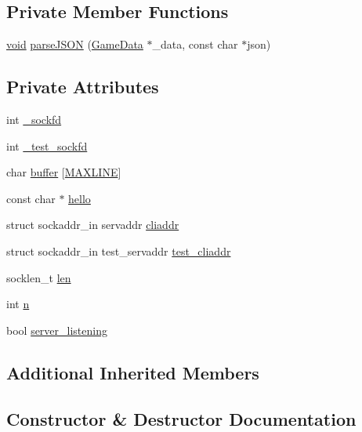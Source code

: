 \subsection*{Private Member Functions}
\begin{DoxyCompactItemize}
\item 
\hyperlink{imgui__impl__opengl3__loader_8h_ac668e7cffd9e2e9cfee428b9b2f34fa7}{void} \hyperlink{classNetworkComponent_ab1bff9bb826d0fdc4af6a1c829121f2c}{parse\+J\+S\+ON} (\hyperlink{structGameData}{Game\+Data} $\ast$\+\_\+data, const char $\ast$json)
\end{DoxyCompactItemize}
\subsection*{Private Attributes}
\begin{DoxyCompactItemize}
\item 
int \hyperlink{classNetworkComponent_a7aa71330f04383d8349a62e5666a4c82}{\+\_\+sockfd}
\item 
int \hyperlink{classNetworkComponent_a4cbd1e5311814f9235d7eaf11e3e7b31}{\+\_\+test\+\_\+sockfd}
\item 
char \hyperlink{classNetworkComponent_af682194eef054755518d56ea82cade26}{buffer} \mbox{[}\hyperlink{game_8h_a3e937c42922f7601edb17b747602c471}{M\+A\+X\+L\+I\+NE}\mbox{]}
\item 
const char $\ast$ \hyperlink{classNetworkComponent_a5be059c686dbfa243a41021f48c0f29a}{hello}
\item 
struct sockaddr\+\_\+in servaddr \hyperlink{classNetworkComponent_a95a10a88ae17cf254463cf4939ccc76a}{cliaddr}
\item 
struct sockaddr\+\_\+in test\+\_\+servaddr \hyperlink{classNetworkComponent_ab8876db02b0915f6f7cc5e31eee6e84b}{test\+\_\+cliaddr}
\item 
socklen\+\_\+t \hyperlink{classNetworkComponent_a728a0d61e8d3ad43db43caf54f84cf00}{len}
\item 
int \hyperlink{classNetworkComponent_ae32524115fa63fc34086d31c951847f6}{n}
\item 
bool \hyperlink{classNetworkComponent_a67b7c72ae881585204af071b8aec2a21}{server\+\_\+listening}
\end{DoxyCompactItemize}
\subsection*{Additional Inherited Members}


\subsection{Constructor \& Destructor Documentation}
\mbox{\label{classNetworkComponent_ac1538e812d154f87406f11ae3d2083ff}} 

